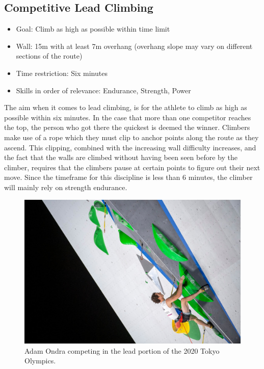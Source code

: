 \subsection{Competitive Lead Climbing}
\begin{itemize}
    \item Goal: Climb as high as possible within time limit
    \item Wall: 15m with at least 7m overhang (overhang slope may vary on different sections of the route)
    \item Time restriction: Six minutes
    \item Skills in order of relevance: Endurance, Strength, Power
\end{itemize}
The aim when it comes to lead climbing, is for the athlete to climb as high as possible within six minutes. In the case that more than one competitor reaches the top, the person who got there the quickest is deemed the winner. Climbers make use of a rope which they must clip to anchor points along the route as they ascend. This clipping, combined with the increasing wall difficulty increases, and the fact that the walls are climbed without having been seen before by the climber, requires that the climbers pause at certain points to figure out their next move. Since the timeframe for this discipline is less than 6 minutes, the climber will mainly rely on strength endurance.
\begin{figure}[H]
    \centering
    \includegraphics[width=0.9\linewidth]{figs/comp_lead.jpg}
    \caption{Adam Ondra competing in the lead portion of the 2020 Tokyo Olympics. \citep{Branch_2021}}
\end{figure}


